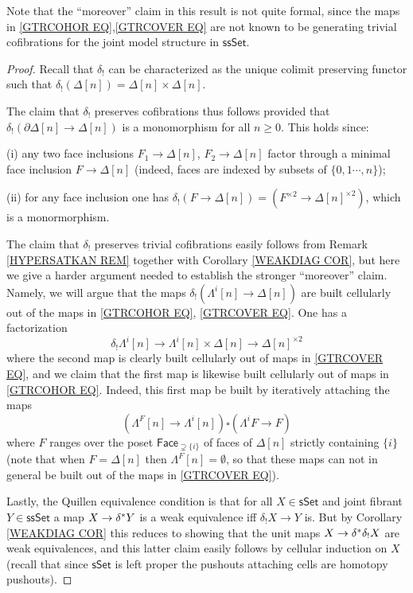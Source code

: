 \documentclass[a4paper,10pt,draft]{article}%
\numberwithin{equation}{section}%
\numberwithin{figure}{section}
\begin{document}
Note that the ``moreover'' claim in this result is not quite formal, since the maps in \eqref{GTRCOHOR EQ},\eqref{GTRCOVER EQ} are not known to be generating trivial cofibrations for the joint model structure in $\mathsf{ssSet}$.


\begin{proof}
	Recall that $\delta_!$ can be characterized as the unique colimit preserving functor such that 
	$\delta_!(\Delta[n])=\Delta[n] \times \Delta[n]$.

	The claim that $\delta_!$ preserves cofibrations thus follows provided that 
	$\delta_{!}\left( \partial \Delta[n] \to \Delta[n]\right)$
	is a monomorphism for all $n\geq 0$.
	This holds since:
	\begin{inparaenum}
		\item[(i)] any two face inclusions $F_1 \to \Delta[n]$, $F_2 \to \Delta[n]$ factor through a minimal face inclusion $F \to \Delta[n]$ (indeed, faces are indexed by subsets of $\{0,1\cdots,n\}$); 
		\item[(ii)] for any face inclusion one has 
		$\delta_{!}\left( F \to \Delta[n]\right) = 
		\left(F^{\times 2} \to \Delta[n]^{\times 2} \right)$, which is a monormorphism.
	\end{inparaenum}

The claim that $\delta_!$ preserves trivial cofibrations easily follows from Remark \ref{HYPERSATKAN REM} together with Corollary \ref{WEAKDIAG COR}, but here we give a harder argument needed to establish the stronger ``moreover'' claim.
Namely, we will argue that the maps
$\delta_! \left( \Lambda^i[n] \to \Delta[n]\right)$
are built cellularly out of the maps in 
\eqref{GTRCOHOR EQ}, \eqref{GTRCOVER EQ}.
One has a factorization
\[
	\delta_! \Lambda^i[n] \to
	\Lambda^i[n] \times \Delta[n] \to \Delta[n]^{\times 2}
\]
where the second map is clearly built cellularly out of maps in 
\eqref{GTRCOVER EQ}, and we claim that 
the first map is likewise built cellularly out of maps in \eqref{GTRCOHOR EQ}.
Indeed, this first map be built by iteratively attaching the maps
\[
	\left(\Lambda^{F}[n] \to \Lambda^i[n] \right)
		\square
	\left(\Lambda^{i}F \to F \right)
\]
where $F$ ranges over the poset $\mathsf{Face}_{\supsetneq \{i\}}$
of faces of $\Delta[n]$ strictly containing $\{i\}$ 
(note that when $F=\Delta[n]$ then $\Lambda^F[n]=\emptyset$, so that these maps can not in general be built out of the maps in \eqref{GTRCOVER EQ}). 

Lastly, the Quillen equivalence condition 
is that for all $X \in \mathsf{sSet}$ and joint fibrant
$Y \in \mathsf{ssSet}$ a map
$X \to \delta^{\**} Y$ is a weak equivalence iff 
$\delta_!X \to Y$ is. 
But by Corollary \ref{WEAKDIAG COR}
this reduces to showing
that the unit maps $X \to \delta^{\**} \delta_! X$
are weak equivalences, and this latter claim easily follows by cellular induction on $X$
(recall that since $\mathsf{sSet}$ is left proper the pushouts attaching cells are homotopy pushouts).
\end{proof}
\end{document}
